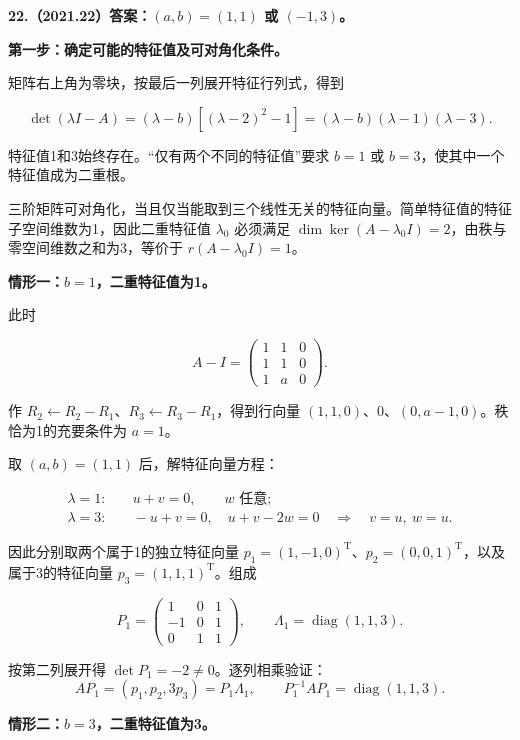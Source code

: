 \documentclass[UTF8,11pt,fontset=windows]{ctexart}
\begin{document}
\clearpage

\textbf{22.（2021.22）答案：$(a,b)=(1,1)$ 或 $(-1,3)$。}

\textbf{第一步：确定可能的特征值及可对角化条件。}

矩阵右上角为零块，按最后一列展开特征行列式，得到

$$
\det(\lambda I-A)
=(\lambda-b)[(\lambda-2)^2-1]
=(\lambda-b)(\lambda-1)(\lambda-3).
$$

特征值1和3始终存在。“仅有两个不同的特征值”要求 $b=1$ 或 $b=3$，使其中一个特征值成为二重根。

三阶矩阵可对角化，当且仅当能取到三个线性无关的特征向量。简单特征值的特征子空间维数为1，因此二重特征值 $\lambda_0$ 必须满足 $\dim\ker(A-\lambda_0I)=2$，由秩与零空间维数之和为3，等价于 $r(A-\lambda_0I)=1$。

\textbf{情形一：$b=1$，二重特征值为1。}

此时

$$
A-I=\begin{pmatrix}1&1&0\\1&1&0\\1&a&0\end{pmatrix}.
$$

作 $R_2\leftarrow R_2-R_1$、$R_3\leftarrow R_3-R_1$，得到行向量 $(1,1,0)$、$0$、$(0,a-1,0)$。秩恰为1的充要条件为 $a=1$。

取 $(a,b)=(1,1)$ 后，解特征向量方程：

$$
\begin{aligned}
\lambda=1:&\quad u+v=0,\qquad w\text{ 任意};\\
\lambda=3:&\quad -u+v=0,\quad u+v-2w=0
\quad\Longrightarrow\quad v=u,\ w=u.
\end{aligned}
$$

因此分别取两个属于1的独立特征向量 $p_1=(1,-1,0)^{\mathrm T}$、$p_2=(0,0,1)^{\mathrm T}$，以及属于3的特征向量 $p_3=(1,1,1)^{\mathrm T}$。组成

$$
\boxed{P_1=\begin{pmatrix}1&0&1\\-1&0&1\\0&1&1\end{pmatrix}},
\qquad \Lambda_1=\operatorname{diag}(1,1,3).
$$

按第二列展开得 $\det P_1=-2\ne0$。逐列相乘验证：
$$
AP_1=(p_1,p_2,3p_3)=P_1\Lambda_1,
\qquad \boxed{P_1^{-1}AP_1=\operatorname{diag}(1,1,3)}.
$$

\textbf{情形二：$b=3$，二重特征值为3。}
\end{document}
